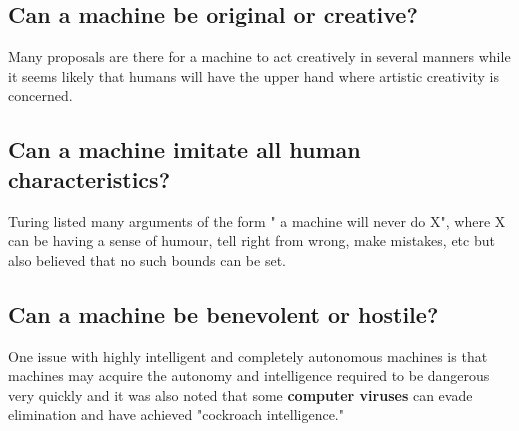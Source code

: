 \documentclass[10pt,a4paper,twoside]{article}
\begin{document}
\subsection{Can a machine be original or creative?} Many proposals are there for a machine to act creatively in several manners while it seems likely that humans will have the upper hand where artistic creativity is concerned.

\subsection{Can a machine imitate all human characteristics?} Turing listed many arguments of the form " a machine will never do X", where X can be having a sense of humour, tell right from wrong, make mistakes, etc but also believed that no such bounds can be set.

\subsection{Can a machine be benevolent or hostile?} One issue with highly intelligent and completely autonomous machines is that machines may acquire the autonomy and intelligence required to be dangerous very quickly and it was also noted that some \textbf{computer viruses} can evade elimination and have achieved "cockroach intelligence."
\end{document}
